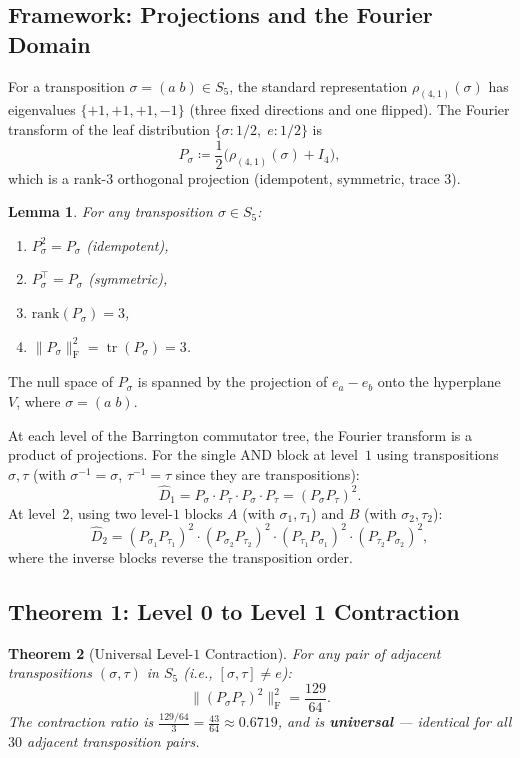 \documentclass[11pt]{article}
\newtheorem{theorem}{Theorem}[section]
\newtheorem{lemma}[theorem]{Lemma}
\DeclareMathOperator{\tr}{tr}
\newcommand{\norm}[1]{\lVert #1 \rVert}
\newcommand{\frob}[1]{\norm{#1}_{\mathrm{F}}}
\newcommand{\Dhat}{\widehat{D}}
\begin{document}
\subsection{Framework: Projections and the Fourier Domain}
\label{sec:framework}

For a transposition $\sigma = (a\;b) \in S_5$, the standard representation
$\rho_{(4,1)}(\sigma)$ has eigenvalues $\{+1, +1, +1, -1\}$ (three fixed
directions and one flipped). The Fourier transform of the leaf distribution
$\{\sigma : 1/2,\; e : 1/2\}$ is
\[
P_\sigma \coloneqq \frac{1}{2}\bigl(\rho_{(4,1)}(\sigma) + I_4\bigr),
\]
which is a rank-$3$ orthogonal projection (idempotent, symmetric, trace $3$).

\begin{lemma}
\label{lem:proj_basic}
For any transposition $\sigma \in S_5$:
\begin{enumerate}[label=(\alph*),nosep]
\item $P_\sigma^2 = P_\sigma$ (idempotent),
\item $P_\sigma^\top = P_\sigma$ (symmetric),
\item $\mathrm{rank}(P_\sigma) = 3$,
\item $\frob{P_\sigma}^2 = \tr(P_\sigma) = 3$.
\end{enumerate}
\end{lemma}

The null space of $P_\sigma$ is spanned by the projection of $e_a - e_b$
onto the hyperplane $V$, where $\sigma = (a\;b)$.

At each level of the Barrington commutator tree, the Fourier transform is a product
of projections. For the single AND block at level~$1$ using transpositions $\sigma, \tau$
(with $\sigma^{-1} = \sigma$, $\tau^{-1} = \tau$ since they are transpositions):
\[
\Dhat_1 = P_\sigma \cdot P_\tau \cdot P_\sigma \cdot P_\tau = (P_\sigma P_\tau)^2.
\]
At level~$2$, using two level-$1$ blocks $A$ (with $\sigma_1, \tau_1$) and
$B$ (with $\sigma_2, \tau_2$):
\[
\Dhat_2 = (P_{\sigma_1} P_{\tau_1})^2 \cdot (P_{\sigma_2} P_{\tau_2})^2
\cdot (P_{\tau_1} P_{\sigma_1})^2 \cdot (P_{\tau_2} P_{\sigma_2})^2,
\]
where the inverse blocks reverse the transposition order.


\subsection{Theorem 1: Level 0 to Level 1 Contraction}

\begin{theorem}[Universal Level-$1$ Contraction]
\label{thm:level01}
For any pair of adjacent transpositions $(\sigma, \tau)$ in $S_5$
(i.e., $[\sigma, \tau] \neq e$):
\[
\frob{(P_\sigma P_\tau)^2}^2 = \frac{129}{64}.
\]
The contraction ratio is $\frac{129/64}{3} = \frac{43}{64} \approx 0.6719$,
and is \textbf{universal} --- identical for all $30$ adjacent transposition pairs.
\end{theorem}
\end{document}
